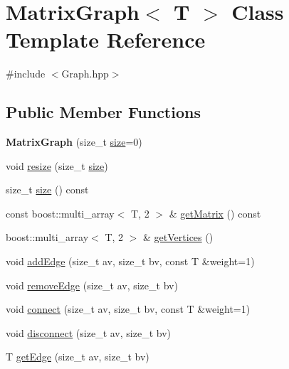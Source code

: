 \hypertarget{class_matrix_graph}{}\section{Matrix\+Graph$<$ T $>$ Class Template Reference}
\label{class_matrix_graph}


{\ttfamily \#include $<$Graph.\+hpp$>$}

\subsection*{Public Member Functions}
\begin{DoxyCompactItemize}
\item 
\mbox{\label{class_matrix_graph_af29d807007dbccc14567f5ee60c6b4eb}} 
{\bfseries Matrix\+Graph} (size\+\_\+t \hyperlink{class_matrix_graph_acb1c06541182d4bb472c9813942a75b0}{size}=0)
\item 
void \hyperlink{class_matrix_graph_acc5d5c603987bc7a00fc11d37f1edd83}{resize} (size\+\_\+t \hyperlink{class_matrix_graph_acb1c06541182d4bb472c9813942a75b0}{size})
\item 
size\+\_\+t \hyperlink{class_matrix_graph_acb1c06541182d4bb472c9813942a75b0}{size} () const
\item 
const boost\+::multi\+\_\+array$<$ T, 2 $>$ \& \hyperlink{class_matrix_graph_ae6b799585fda6e65cb2fa6693cc8603e}{get\+Matrix} () const
\item 
boost\+::multi\+\_\+array$<$ T, 2 $>$ \& \hyperlink{class_matrix_graph_a4775ce045cd24d6ec81755fc571700ea}{get\+Vertices} ()
\item 
void \hyperlink{class_matrix_graph_af4d5e646d3bc3618b83c94610108e089}{add\+Edge} (size\+\_\+t av, size\+\_\+t bv, const T \&weight=1)
\item 
void \hyperlink{class_matrix_graph_af100d2512c1a8328a792963acff74ef3}{remove\+Edge} (size\+\_\+t av, size\+\_\+t bv)
\item 
void \hyperlink{class_matrix_graph_a32ed83475da8b8d144bfc3335ae33df0}{connect} (size\+\_\+t av, size\+\_\+t bv, const T \&weight=1)
\item 
void \hyperlink{class_matrix_graph_ab04e62d1fa80a25d27594f87ded006ce}{disconnect} (size\+\_\+t av, size\+\_\+t bv)
\item 
T \hyperlink{class_matrix_graph_af1e22d0a92d5475011c0073e84c2c254}{get\+Edge} (size\+\_\+t av, size\+\_\+t bv)
\end{DoxyCompactItemize}
